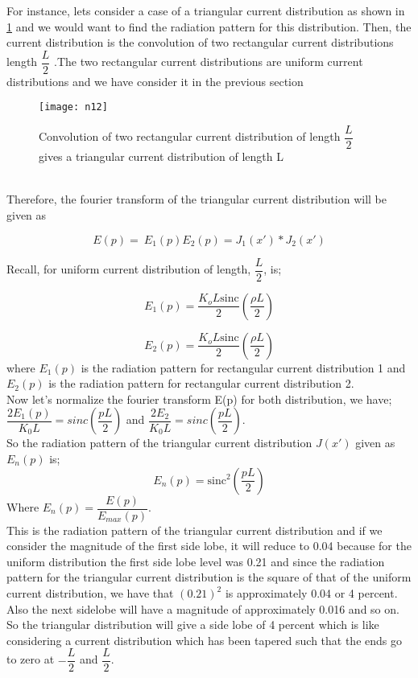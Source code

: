 For instance, lets consider a case of a triangular current distribution as shown in \ref{fig:n13} and we would want to find the radiation pattern for this distribution. Then, the current distribution is the convolution of two rectangular current distributions length $\dfrac{L}{2}$ .The two rectangular current distributions are uniform current distributions and we have consider it in the previous section
\begin{figure}[h]
	\centering
	\texttt{[image: n12]}
	\caption{Convolution of two rectangular current distribution of length $\dfrac{L}{2}$ gives a triangular current distribution of length L}
	\label{fig:n13}
\end{figure}
\\
Therefore, the fourier transform of the triangular current distribution will be given as

\begin{equation*}
E(p) =  \ E_1(p) E_{2}(p) = J_{1}(x') * J_{2}(x')
\end{equation*}

Recall, for uniform current distribution of length, $\dfrac{L}{2}$, is;

$$
E_{1}(p) = \dfrac{K_{o}L\text{sinc}}{2} \left(\dfrac{\rho L}{2}\right)$$

$$
E_{2}(p) = \dfrac{K_{o}L\text{sinc}}{2} \left(\dfrac{\rho L}{2}\right)$$
where $E_{1}(p)$ is the radiation pattern for rectangular current distribution 1
and $E_2(p)$ is the radiation pattern for rectangular current distribution 2.\\

Now let's normalize the fourier transform E(p) for both distribution, we have;\\
$\dfrac{2E_1(p)}{K_0L} = sinc(\dfrac{pL}{2})$ and $\dfrac{2E_2}{K_0L} = sinc(\dfrac{pL}{2})$.\\
So the radiation pattern of the triangular current distribution $J(x')$ given as $E_n(p)$ is;
\begin{equation}
	E_n(p) = \text{sinc}^2\left(\dfrac{pL}{2}\right)
\end{equation}  
Where $E_n(p) = \dfrac{E(p)}{E_{max}(p)}$.\\ This is the radiation pattern of the triangular current distribution and if we consider the magnitude of the first side lobe, it will reduce to 0.04 because for the uniform distribution the first side lobe level was 0.21 and since the radiation pattern for the triangular current distribution is the square of that of the uniform current distribution, we have that $(0.21)^2$ is approximately 0.04 or 4 percent. Also the next sidelobe will have a magnitude of approximately 0.016 and so on. So the triangular distribution will give a side lobe of 4 percent which is like considering a current distribution which has been tapered such that the ends go to zero at $-\dfrac{L}{2}$ and $\dfrac{L}{2}$.\\

